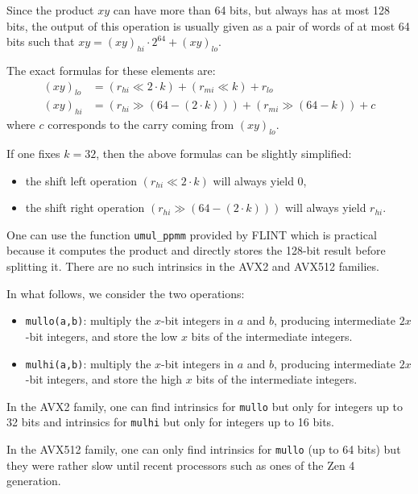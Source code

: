 \documentclass[a4paper]{article}
\begin{document}
Since the product $xy$ can have more than 64 bits, but always has at most 128 bits, the output of this operation is usually given as a pair of words of at most 64 
bits such that $xy = (xy)_{hi}\cdot 2^{64} + (xy)_{lo}$.

\bigskip
The exact formulas for these elements are:
\begin{align}
    (xy)_{lo} &= (r_{hi} \ll 2\cdot k) + (r_{mi} \ll k) + r_{lo} \nonumber \\
    (xy)_{hi} &= (r_{hi} \gg (64 - (2\cdot k))) + (r_{mi} \gg (64 - k)) + c \label{carry}
\end{align}
where $c$ corresponds to the carry coming from $(xy)_{lo}$.

\begin{remark}
    If one fixes $k=32$, then the above formulas can be slightly simplified:
    \begin{itemize}
        \item the shift left operation $(r_{hi} \ll 2\cdot k)$ will always yield 0,
        \item the shift right operation $(r_{hi} \gg (64 - (2\cdot k)))$ will always yield $r_{hi}$.
    \end{itemize}
\end{remark}

\bigskip
One can use the function \texttt{umul\_ppmm} provided by FLINT which is practical because it computes the product and
directly stores the 128-bit result before splitting it.
There are no such intrinsics in the AVX2 and AVX512 families.

\bigskip
In what follows, we consider the two operations:
\begin{itemize}
    \item \texttt{mullo(a,b)}: multiply the $x$-bit integers in $a$ and $b$, producing intermediate $2x$-bit integers, 
    and store the low $x$ bits of the intermediate integers.
    \item \texttt{mulhi(a,b)}: multiply the $x$-bit integers in $a$ and $b$, producing intermediate $2x$-bit integers, 
    and store the high $x$ bits of the intermediate integers.
\end{itemize}

In the AVX2 family, one can find intrinsics for \texttt{mullo} but only for integers up to 32 bits and intrinsics for 
\texttt{mulhi} but only for integers up to 16 bits.

In the AVX512 family, one can only find intrinsics for \texttt{mullo} (up to 64 bits) but they were rather slow
until recent processors such as ones of the Zen 4 generation.
\end{document}
